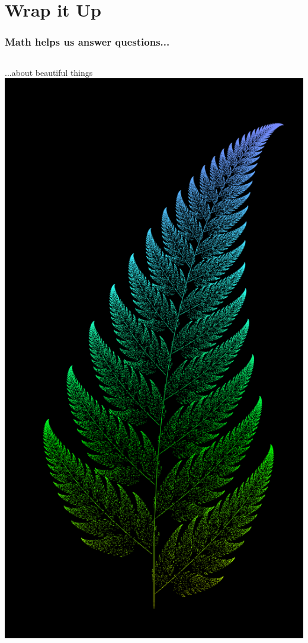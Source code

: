 \documentclass{beamer}
\theoremstyle{mystyle}
\begin{document}
\section{Wrap it Up}

\frame{\tableofcontents[currentsection]}

\begin{frame}
\frametitle{Math helps us answer questions...}

\begin{center}
	\vspace{-0.1in}
	\begin{columns}
			...about beautiful things 
			\includegraphics[scale=0.017]{fern.png}

\end{columns}
\end{center}
\end{frame}
\end{document}
